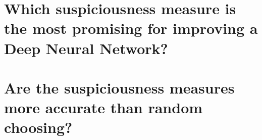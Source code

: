 \section{Which suspiciousness measure is the most promising for improving a Deep Neural Network?}\label{sec:which-suspiciousness-measure-is-the-most-promising-for-improving-a-deep-neural-network?}
\section{Are the suspiciousness measures more accurate than random choosing?}\label{sec:are-the-suspiciousness-measures-more-accurate-than-random-choosing?}